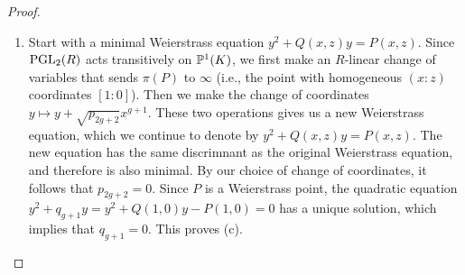 \begin{proof}
\begin{enumerate}
%  
 \item
 Start with a minimal Weierstrass equation $y^2+Q(x,z)y=P(x,z)$. Since $\PGL(R)$ acts transitively on $\P^1(K)$, we first make an $R$-linear change of variables that sends $\pi(P)$ to $\infty$ (i.e., the point with homogeneous $(x:z)$ coordinates $[1:0]$). Then we make the change of coordinates $y \mapsto y + \sqrt{p_{2g+2}} x^{g+1}$. These two operations gives us a new Weierstrass equation, which we continue to denote by $y^2+Q(x,z)y=P(x,z)$. The new equation has the same discrimnant as the original Weierstrass equation, and therefore is also minimal. By our choice of change of coordinates, it follows that $p_{2g+2} = 0$. Since $P$ is a Weierstrass point, the quadratic equation $y^2+q_{g+1}y=y^2+Q(1,0)y-P(1,0)=0$ has a unique solution, which implies that $q_{g+1} = 0$. This proves (c). 

\end{enumerate}
\end{proof}
